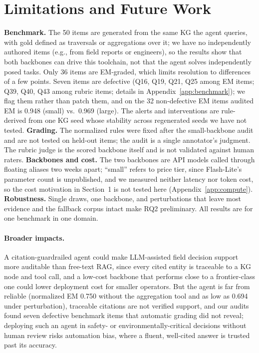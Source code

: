 \documentclass{article}
\begin{document}
\section{Limitations and Future Work}
\label{sec:limits}

\textbf{Benchmark.} The 50 items are generated from the same KG the agent
queries, with gold defined as traversals or aggregations over it; we have no
independently authored items (e.g., from field reports or engineers), so the
results show that both backbones can drive this toolchain, not that the agent
solves independently posed tasks. Only 36 items are EM-graded, which limits
resolution to differences of a few points. Seven items are defective (Q16,
Q19, Q21, Q25 among EM items; Q39, Q40, Q43 among rubric items; details in
Appendix~\ref{app:benchmark}); we flag them rather than patch them, and on the
32 non-defective EM items audited EM is 0.948 (small) vs.\ 0.969 (large). The
alerts and interventions are rule-derived from one KG seed whose stability
across regenerated seeds we have not tested.
\textbf{Grading.} The normalized rules were fixed after the small-backbone
audit and are not tested on held-out items; the audit is a single annotator's
judgment. The rubric judge is the scored backbone itself and is not validated
against human raters. \textbf{Backbones and cost.} The two backbones are API
models called through floating aliases two weeks apart; ``small'' refers to
price tier, since Flash-Lite's parameter count is unpublished, and we measured
neither latency nor token cost, so the cost motivation in Section~1 is not
tested here (Appendix~\ref{app:compute}). \textbf{Robustness.} Single draws,
one backbone, and perturbations that leave most evidence and the fallback
corpus intact make RQ2 preliminary. All results are for one benchmark in one
domain.

\paragraph{Broader impacts.} A citation-guardrailed agent could make
LLM-assisted field decision support more auditable than free-text RAG, since
every cited entity is traceable to a KG node and tool call, and a low-cost
backbone that performs close to a frontier-class one could lower deployment
cost for smaller operators. But the agent is far from reliable (normalized EM
0.750 without the aggregation tool and as low as 0.694 under perturbation),
traceable citations are not verified support, and our audits found seven
defective benchmark items that automatic grading did not reveal; deploying
such an agent in safety- or environmentally-critical decisions without human
review risks automation bias, where a fluent, well-cited answer is trusted past
its accuracy.
\end{document}

